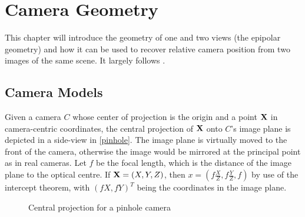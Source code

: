 \chapter{Camera Geometry}

This chapter will introduce the geometry of one and two views (the epipolar geometry) and
how it can be used to recover relative camera position from two images of the
same scene. It largely follows \citep[chapters 6,7]{h&z2004}.

\section{Camera Models}

Given a camera $C$ whose center of projection is the origin and a point
$\mathbf{X}$ in camera-centric coordinates, the central projection of
$\mathbf{X}$ onto $C$'s image plane is depicted in a side-view in
\autoref{pinhole}.  The image plane is virtually moved to the front of the
camera, otherwise the image would be mirrored at the principal point as in real
cameras.  Let $f$ be the focal length, which is the distance of the image plane
to the optical centre.  If $\mathbf{X} = (X,Y,Z)$, then $x=\left(f \frac{X}{Z},
f \frac{Y}{Z}, f\right)$ by use of the intercept theorem, with $\left(fX,
fY\right)^T$ being the coordinates in the image plane.

\begin{figure}[h]
   {\centering      
      
      \caption{Central projection for a pinhole camera}
   \label{pinhole}}
\end{figure}


